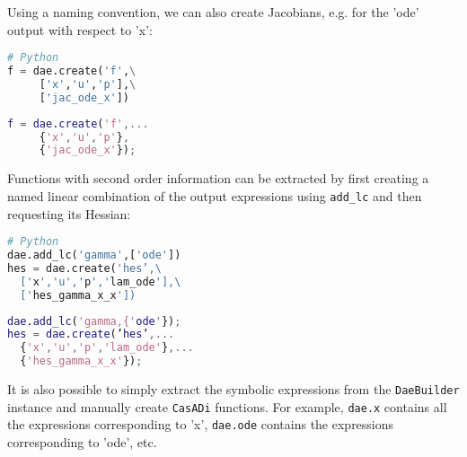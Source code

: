\documentclass[a4paper,12pt]{book}
\newcommand{\CasADi}{\texttt{CasADi}\xspace}
\newcommand{\python}[1]{\lstinline[language=Python]{#1}}
\begin{document}
Using a naming convention, we can also create Jacobians, e.g. for the 'ode'
output with respect to 'x':

\begin{minipage}[t]{0.5\textwidth}
\begin{lstlisting}[language=Python]
# Python
f = dae.create('f',\
     ['x','u','p'],\
     ['jac_ode_x'])
\end{lstlisting}
\end{minipage}
\begin{minipage}[t]{0.5\textwidth}
\begin{lstlisting}[language=Matlab]
% MATLAB
f = dae.create('f',...
     {'x','u','p'},
     {'jac_ode_x'});
\end{lstlisting}
\end{minipage}

Functions with second order information can be extracted by first creating
a named linear combination of the output expressions using \python{add_lc}
and then requesting its Hessian:

\begin{minipage}[t]{0.5\textwidth}
\begin{lstlisting}[language=Python]
# Python
dae.add_lc('gamma',['ode'])
hes = dae.create('hes’,\
  ['x','u','p','lam_ode'],\
  ['hes_gamma_x_x'])
\end{lstlisting}
\end{minipage}
\begin{minipage}[t]{0.5\textwidth}
\begin{lstlisting}[language=Matlab]
% MATLAB
dae.add_lc('gamma,{'ode'});
hes = dae.create(’hes’,...
  {'x','u','p','lam_ode'},...
  {'hes_gamma_x_x'});
\end{lstlisting}
\end{minipage}

It is also possible to simply extract the symbolic expressions from the
\texttt{DaeBuilder} instance and manually create \CasADi functions.
For example, \python{dae.x} contains all the expressions corresponding to 'x',
\python{dae.ode} contains the expressions corresponding to 'ode', etc.

\end{document}
